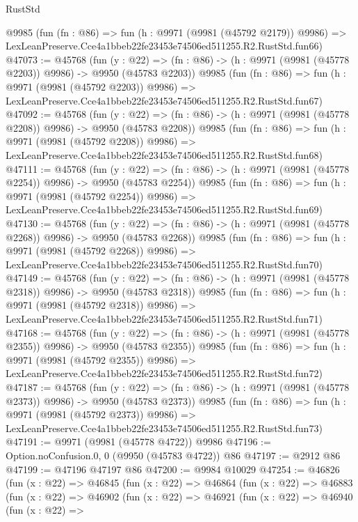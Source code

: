\begin{lexlean}{RustStd}
\begin{coremodule}
    @9985
    (fun (fn : @86) =>
    fun (h : @9971 (@9981 (@45792 @2179)) @9986) =>
    LexLeanPreserve.Cce4a1bbeb22fe23453e74506ed511255.R2.RustStd.fun66)
@47073 := @45768
    (fun (y : @22) =>
    (fn : @86) -> (h : @9971 (@9981 (@45778 @2203)) @9986) -> @9950 (@45783 @2203))
    @9985
    (fun (fn : @86) =>
    fun (h : @9971 (@9981 (@45792 @2203)) @9986) =>
    LexLeanPreserve.Cce4a1bbeb22fe23453e74506ed511255.R2.RustStd.fun67)
@47092 := @45768
    (fun (y : @22) =>
    (fn : @86) -> (h : @9971 (@9981 (@45778 @2208)) @9986) -> @9950 (@45783 @2208))
    @9985
    (fun (fn : @86) =>
    fun (h : @9971 (@9981 (@45792 @2208)) @9986) =>
    LexLeanPreserve.Cce4a1bbeb22fe23453e74506ed511255.R2.RustStd.fun68)
@47111 := @45768
    (fun (y : @22) =>
    (fn : @86) -> (h : @9971 (@9981 (@45778 @2254)) @9986) -> @9950 (@45783 @2254))
    @9985
    (fun (fn : @86) =>
    fun (h : @9971 (@9981 (@45792 @2254)) @9986) =>
    LexLeanPreserve.Cce4a1bbeb22fe23453e74506ed511255.R2.RustStd.fun69)
@47130 := @45768
    (fun (y : @22) =>
    (fn : @86) -> (h : @9971 (@9981 (@45778 @2268)) @9986) -> @9950 (@45783 @2268))
    @9985
    (fun (fn : @86) =>
    fun (h : @9971 (@9981 (@45792 @2268)) @9986) =>
    LexLeanPreserve.Cce4a1bbeb22fe23453e74506ed511255.R2.RustStd.fun70)
@47149 := @45768
    (fun (y : @22) =>
    (fn : @86) -> (h : @9971 (@9981 (@45778 @2318)) @9986) -> @9950 (@45783 @2318))
    @9985
    (fun (fn : @86) =>
    fun (h : @9971 (@9981 (@45792 @2318)) @9986) =>
    LexLeanPreserve.Cce4a1bbeb22fe23453e74506ed511255.R2.RustStd.fun71)
@47168 := @45768
    (fun (y : @22) =>
    (fn : @86) -> (h : @9971 (@9981 (@45778 @2355)) @9986) -> @9950 (@45783 @2355))
    @9985
    (fun (fn : @86) =>
    fun (h : @9971 (@9981 (@45792 @2355)) @9986) =>
    LexLeanPreserve.Cce4a1bbeb22fe23453e74506ed511255.R2.RustStd.fun72)
@47187 := @45768
    (fun (y : @22) =>
    (fn : @86) -> (h : @9971 (@9981 (@45778 @2373)) @9986) -> @9950 (@45783 @2373))
    @9985
    (fun (fn : @86) =>
    fun (h : @9971 (@9981 (@45792 @2373)) @9986) =>
    LexLeanPreserve.Cce4a1bbeb22fe23453e74506ed511255.R2.RustStd.fun73)
@47191 := @9971 (@9981 (@45778 @4722)) @9986
@47196 := Option.noConfusion.{0, 0} (@9950 (@45783 @4722)) @86
@47197 := @2912 @86
@47199 := @47196 @47197 @86
@47200 := @9984 @10029
@47254 := @46826
    (fun (x : @22) =>
    @46845
      (fun (x : @22) =>
      @46864
        (fun (x : @22) =>
        @46883
          (fun (x : @22) =>
          @46902
            (fun (x : @22) =>
            @46921
              (fun (x : @22) =>
              @46940
                (fun (x : @22) =>

\end{coremodule}
\end{lexlean}
